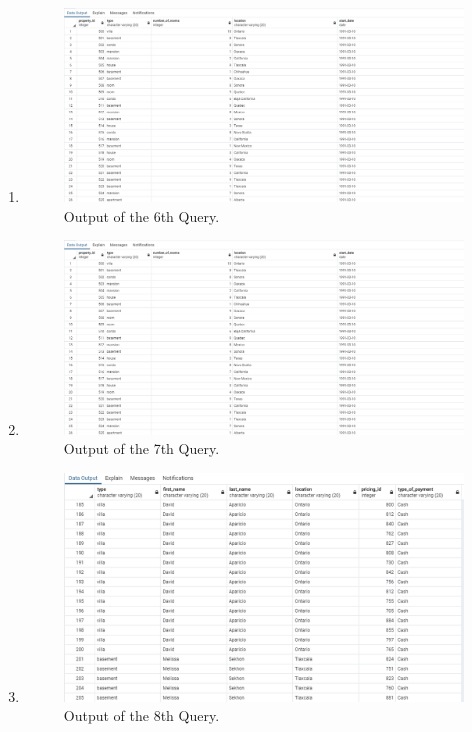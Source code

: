 \documentclass[12pt, lettersize]{article}
\theoremstyle{Remark}
\begin{document}
\begin{enumerate}
		
		
		\item 
		
		
		\begin{figure}[h]
			\centering
			\includegraphics[width= 0.8\linewidth]{Query6Output.png}
			\caption{Output of the 6th Query.}
		\end{figure}
	
		\newpage
		
		\item 
		
		
		\begin{figure}[h]
			\centering
			\includegraphics[width= 0.8\linewidth]{Query6Output.png}
			\caption{Output of the 7th Query.}
		\end{figure}
		
		\newpage
		
		\item 
		
		
		\begin{figure}[h]
			\centering
			\includegraphics[width= 0.7\linewidth]{Query8Output.png}
			\caption{Output of the 8th Query.}
		\end{figure}
		

\end{enumerate}
\end{document}
